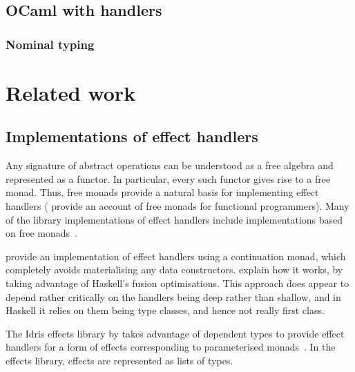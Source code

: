 \documentclass[12pt,mscres,cdtppar,twoside,openright,logo,rightchapter,normalheadings]{infthesis}
\theoremstyle{definition}
\begin{document}
\section{OCaml with handlers}
\label{sec:ocaml-handlers}

\subsection{Nominal typing}

\chapter{Related work}
\label{ch:related-work}

\section{Implementations of effect handlers}
Any signature of abstract operations can be understood as a free
algebra and represented as a functor. In particular, every such
functor gives rise to a free monad. Thus, free monads provide a
natural basis for implementing effect handlers (\citet{Swierstra2008b}
provide an account of free monads for functional programmers).  Many
of the library implementations of effect handlers include
implementations based on free monads~\citep{Kammar2013, Kiselyov2013,
  Kiselyov2015, Brady2013, Wu2014}.

\citet{Kammar2013} provide an implementation of effect handlers using
a continuation monad, which completely avoids materialising any data
constructors. \citet{Wu2015} explain how it works, by taking advantage
of Haskell's fusion optimisations. This approach does appear to depend
rather critically on the handlers being deep rather than shallow, and
in Haskell it relies on them being type classes, and hence not really
first class.

The Idris effects library by \cite{Brady2013} takes advantage of
dependent types to provide effect handlers for a form of effects
corresponding to parameterised monads~\citep{Atkey09}.
%
In the effects library, effects are represented as lists of types.
\end{document}
